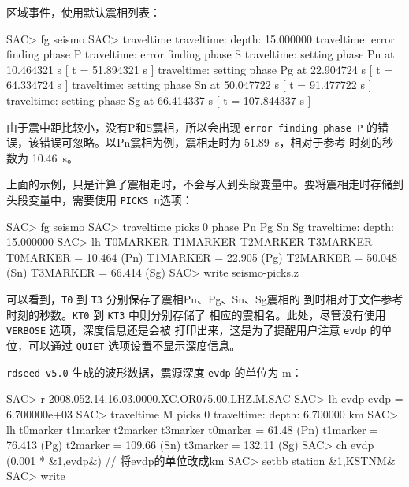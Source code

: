 区域事件，使用默认震相列表：
\begin{SACCode}
SAC> fg seismo
SAC> traveltime
traveltime: depth: 15.000000
traveltime: error finding phase P
traveltime: error finding phase S
traveltime: setting phase Pn       at 10.464321 s [ t = 51.894321 s ]
traveltime: setting phase Pg       at 22.904724 s [ t = 64.334724 s ]
traveltime: setting phase Sn       at 50.047722 s [ t = 91.477722 s ]
traveltime: setting phase Sg       at 66.414337 s [ t = 107.844337 s ]
\end{SACCode}
由于震中距比较小，没有P和S震相，所以会出现 \texttt{error finding phase P}
的错误，该错误可忽略。以Pn震相为例，震相走时为 \SI{51.89}{\s}，相对于参考
时刻的秒数为 \SI{10.46}{\s}。

上面的示例，只是计算了震相走时，不会写入到头段变量中。要将震相走时存储到
头段变量中，需要使用 \texttt{PICKS n}选项：
\begin{SACCode}
SAC> fg seismo
SAC> traveltime picks 0 phase Pn Pg Sn Sg
traveltime: depth: 15.000000
SAC> lh T0MARKER T1MARKER T2MARKER T3MARKER
T0MARKER = 10.464           (Pn)
T1MARKER = 22.905           (Pg)
T2MARKER = 50.048           (Sn)
T3MARKER = 66.414           (Sg)
SAC> write seismo-picks.z
\end{SACCode}
可以看到，\texttt{T0} 到 \texttt{T3} 分别保存了震相Pn、Pg、Sn、Sg震相的
到时相对于文件参考时刻的秒数。\texttt{KT0} 到 \texttt{KT3} 中则分别存储了
相应的震相名。此处，尽管没有使用 \texttt{VERBOSE} 选项，深度信息还是会被
打印出来，这是为了提醒用户注意 \texttt{evdp} 的单位，可以通过 \texttt{QUIET}
选项设置不显示深度信息。

\texttt{rdseed v5.0} 生成的波形数据，震源深度 \texttt{evdp} 的单位为 \si{\m}：
\begin{SACCode}
SAC> r 2008.052.14.16.03.0000.XC.OR075.00.LHZ.M.SAC
SAC> lh evdp
evdp = 6.700000e+03
SAC> traveltime M picks 0
traveltime: depth: 6.700000 km
SAC> lh t0marker t1marker t2marker t3marker
t0marker = 61.48            (Pn)
t1marker = 76.413           (Pg)
t2marker = 109.66           (Sn)
t3marker = 132.11           (Sg)
SAC> ch evdp (0.001 * &1,evdp&) // 将evdp的单位改成km
SAC> setbb station &1,KSTNM&
SAC> write %
\end{SACCode}
